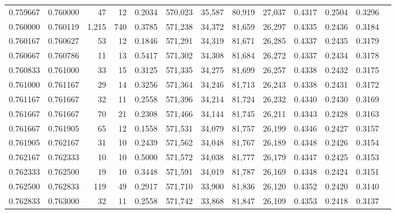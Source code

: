 \begin{tabular}{rrrrrrrrrrrrr}
0.759667 & 0.760000 &    47 &  12 &                                     0.2034 & 570,023 &  35,587 &  80,919 &  27,037 & 0.4317 & 0.2504 & 0.3296 \\
0.760000 & 0.760119 & 1,215 & 740 &                                     0.3785 & 571,238 &  34,372 &  81,659 &  26,297 & 0.4335 & 0.2436 & 0.3184 \\
0.760167 & 0.760627 &    53 &  12 &                                     0.1846 & 571,291 &  34,319 &  81,671 &  26,285 & 0.4337 & 0.2435 & 0.3179 \\
0.760667 & 0.760786 &    11 &  13 &                                     0.5417 & 571,302 &  34,308 &  81,684 &  26,272 & 0.4337 & 0.2434 & 0.3178 \\
0.760833 & 0.761000 &    33 &  15 &                                     0.3125 & 571,335 &  34,275 &  81,699 &  26,257 & 0.4338 & 0.2432 & 0.3175 \\
0.761000 & 0.761167 &    29 &  14 &                                     0.3256 & 571,364 &  34,246 &  81,713 &  26,243 & 0.4338 & 0.2431 & 0.3172 \\
0.761167 & 0.761667 &    32 &  11 &                                     0.2558 & 571,396 &  34,214 &  81,724 &  26,232 & 0.4340 & 0.2430 & 0.3169 \\
0.761667 & 0.761667 &    70 &  21 &                                     0.2308 & 571,466 &  34,144 &  81,745 &  26,211 & 0.4343 & 0.2428 & 0.3163 \\
0.761667 & 0.761905 &    65 &  12 &                                     0.1558 & 571,531 &  34,079 &  81,757 &  26,199 & 0.4346 & 0.2427 & 0.3157 \\
0.761905 & 0.762167 &    31 &  10 &                                     0.2439 & 571,562 &  34,048 &  81,767 &  26,189 & 0.4348 & 0.2426 & 0.3154 \\
0.762167 & 0.762333 &    10 &  10 &                                     0.5000 & 571,572 &  34,038 &  81,777 &  26,179 & 0.4347 & 0.2425 & 0.3153 \\
0.762333 & 0.762500 &    19 &  10 &                                     0.3448 & 571,591 &  34,019 &  81,787 &  26,169 & 0.4348 & 0.2424 & 0.3151 \\
0.762500 & 0.762833 &   119 &  49 &                                     0.2917 & 571,710 &  33,900 &  81,836 &  26,120 & 0.4352 & 0.2420 & 0.3140 \\
0.762833 & 0.763000 &    32 &  11 &                                     0.2558 & 571,742 &  33,868 &  81,847 &  26,109 & 0.4353 & 0.2418 & 0.3137 \\

\end{tabular}
